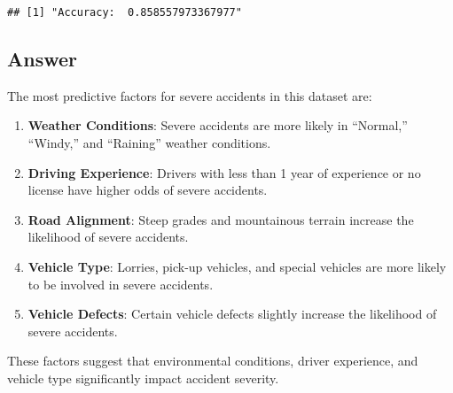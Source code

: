 \documentclass[
]{article}
\newenvironment{Shaded}{\begin{snugshade}}{\end{snugshade}}
\newcommand{\AttributeTok}[1]{\textcolor[rgb]{0.13,0.29,0.53}{#1}}
\newcommand{\CommentTok}[1]{\textcolor[rgb]{0.56,0.35,0.01}{\textit{#1}}}
\newcommand{\DecValTok}[1]{\textcolor[rgb]{0.00,0.00,0.81}{#1}}
\newcommand{\FloatTok}[1]{\textcolor[rgb]{0.00,0.00,0.81}{#1}}
\newcommand{\FunctionTok}[1]{\textcolor[rgb]{0.13,0.29,0.53}{\textbf{#1}}}
\newcommand{\NormalTok}[1]{#1}
\newcommand{\OtherTok}[1]{\textcolor[rgb]{0.56,0.35,0.01}{#1}}
\newcommand{\SpecialCharTok}[1]{\textcolor[rgb]{0.81,0.36,0.00}{\textbf{#1}}}
\newcommand{\StringTok}[1]{\textcolor[rgb]{0.31,0.60,0.02}{#1}}
\providecommand{\tightlist}{%
  \setlength{\itemsep}{0pt}\setlength{\parskip}{0pt}}
\begin{document}
\begin{Shaded}
\end{Shaded}

\begin{verbatim}
## [1] "Accuracy:  0.858557973367977"
\end{verbatim}

\hypertarget{answer-3}{%
\subsection{Answer}\label{answer-3}}

The most predictive factors for severe accidents in this dataset are:

\begin{enumerate}
\def\labelenumi{\arabic{enumi}.}
\tightlist
\item
  \textbf{Weather Conditions}: Severe accidents are more likely in
  ``Normal,'' ``Windy,'' and ``Raining'' weather conditions.
\item
  \textbf{Driving Experience}: Drivers with less than 1 year of
  experience or no license have higher odds of severe accidents.
\item
  \textbf{Road Alignment}: Steep grades and mountainous terrain increase
  the likelihood of severe accidents.
\item
  \textbf{Vehicle Type}: Lorries, pick-up vehicles, and special vehicles
  are more likely to be involved in severe accidents.
\item
  \textbf{Vehicle Defects}: Certain vehicle defects slightly increase
  the likelihood of severe accidents.
\end{enumerate}

These factors suggest that environmental conditions, driver experience,
and vehicle type significantly impact accident severity.
\end{document}
